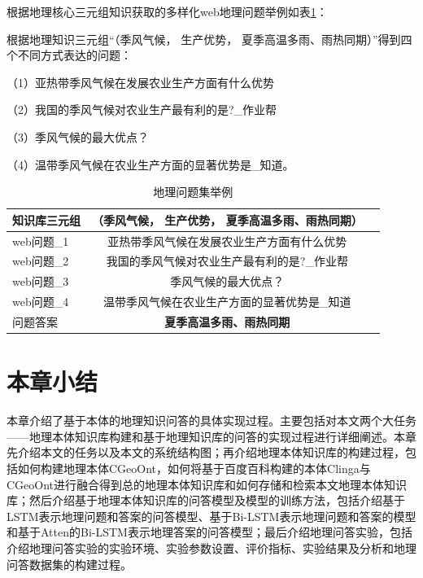 根据地理核心三元组知识获取的多样化web地理问题举例如表\ref{tab:qa_dataset}：

根据地理知识三元组“（季风气候， 生产优势， 夏季高温多雨、雨热同期）”得到四个不同方式表达的问题：

（1）亚热带季风气候在发展农业生产方面有什么优势

（2）我国的季风气候对农业生产最有利的是?\_作业帮

（3）季风气候的最大优点？

（4）温带季风气候在农业生产方面的显著优势是\_知道。

\begin{table}[htbp] 
	\centering
	\caption{\label{tab:qa_dataset}地理问题集举例} 
	\begin{tabular}{lcl}
		\toprule 
		知识库三元组	& \textbf{（季风气候， 生产优势， 夏季高温多雨、雨热同期）}\\
		\midrule 
		web问题\_1 & 亚热带季风气候在发展农业生产方面有什么优势 \\ 
		web问题\_2 & 我国的季风气候对农业生产最有利的是?\_作业帮 \\ 
		web问题\_3 & 季风气候的最大优点？ \\
		web问题\_4 & 温带季风气候在农业生产方面的显著优势是\_知道 \\
		\midrule
		问题答案 & \textbf{夏季高温多雨、雨热同期}\\ 
		\bottomrule 
	\end{tabular} 
\end{table}



\section{本章小结}
本章介绍了基于本体的地理知识问答的具体实现过程。主要包括对本文两个大任务——地理本体知识库构建和基于地理知识库的问答的实现过程进行详细阐述。本章先介绍本文的任务以及本文的系统结构图；再介绍地理本体知识库的构建过程，包括如何构建地理本体CGeoOnt，如何将基于百度百科构建的本体Clinga与CGeoOnt进行融合得到总的地理本体知识库和如何存储和检索本文地理本体知识库；然后介绍基于地理本体知识库的问答模型及模型的训练方法，包括介绍基于LSTM表示地理问题和答案的问答模型、基于Bi-LSTM表示地理问题和答案的模型和基于Atten的Bi-LSTM表示地理答案的问答模型；最后介绍地理问答实验，包括介绍地理问答实验的实验环境、实验参数设置、评价指标、实验结果及分析和地理问答数据集的构建过程。

